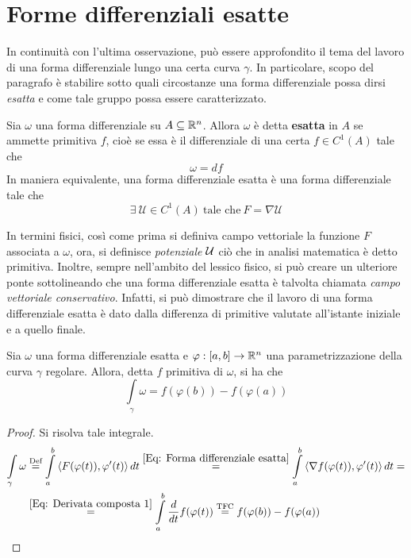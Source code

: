 \section{Forme differenziali esatte}
In continuità con l'ultima osservazione, può essere approfondito il tema del lavoro di una forma differenziale lungo una certa curva $\gamma$. In particolare, scopo del paragrafo è stabilire sotto quali circostanze una forma differenziale possa dirsi \textit{esatta} e come tale gruppo possa essere caratterizzato.
\begin{definition} \label{Def: Forma differenziale esatta}
    Sia $\omega$ una forma differenziale su $A \subseteq \mathbb{R}^n$. Allora $\omega$ è detta \textbf{esatta} in $A$ se ammette primitiva $f$, cioè se essa è il differenziale di una certa $f \in C^1(A)$ tale che 
    \begin{equation}
        \omega = df
    \end{equation}
    In maniera equivalente, una forma differenziale esatta è una forma differenziale tale che
    \begin{equation} \label{Eq: Forma differenziale esatta}
        \exists\ \mathcal{U} \in C^1(A) \ \text{tale che}\ F=\nabla\mathcal{U}
    \end{equation}
\end{definition}
In termini fisici, così come prima si definiva campo vettoriale la funzione $F$ associata a $\omega$, ora, si definisce \textit{potenziale} $\mathcal{U}$ ciò che in analisi matematica è detto primitiva. Inoltre, sempre nell'ambito del lessico fisico, si può creare un ulteriore ponte sottolineando che una forma differenziale esatta è talvolta chiamata \textit{campo vettoriale conservativo}. Infatti, si può dimostrare che il lavoro di una forma differenziale esatta è dato dalla differenza di primitive valutate all'istante iniziale e a quello finale.
\begin{theorem} \label{Teo: Integrale di forme differenziali esatte}
    Sia $\omega$ una forma differenziale esatta e $\varphi: [a, b] \to \mathbb{R}^n$ una parametrizzazione della curva $\gamma$ regolare. Allora, detta $f$ primitiva di $\omega$, si ha che 
    \begin{equation}
        \int\limits_\gamma{\omega}= f(\varphi(b))-f(\varphi(a))
    \end{equation}
\end{theorem}
\begin{proof}
    Si risolva tale integrale.
    \begin{equation}
    \begin{aligned}
        \int\limits_{\gamma}{\omega} &\overset{\text{Def}}{=}\int\limits_{a}^{b}{\langle F(\varphi(t)), \varphi'(t)\rangle}\, dt \overset{\eqref{Eq: Forma differenziale esatta}}{=} \int\limits_{a}^{b}{\langle \nabla f(\varphi(t)), \varphi'(t) \rangle}\, dt =\\
        &\overset{\eqref{Eq: Derivata composta 1}}{=}\int\limits_{a}^{b}\frac{d}{dt}{f(\varphi(t))} \overset{\text{TFC}}{=} f(\varphi(b))- f(\varphi(a))
    \end{aligned}
    \end{equation}
\end{proof}

